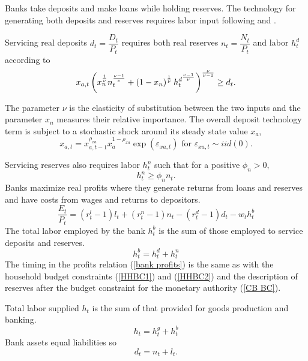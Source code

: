 \documentclass[]{article}
\begin{document}
Banks take deposits and make loans while holding reserves. The technology
for generating both deposits and reserves requires labor input following
\textcite{christiano1995inside} and \textcite{ireland2014macroeconomics}.

Servicing real deposits $d_{t}=\dfrac{D_{t}}{P_{t}}$ requires both real reserves $n_{t}=\dfrac{N_{t}}{P_{t}}$ and
labor $h_{t}^{d}$ according to
\begin{equation} \label{d}
x_{a,t}\left( x_{n}^{\frac{1}{\nu }}n_{t}^{\frac{\nu -1}{\nu }}+\left(
1-x_{n}\right) ^{\frac{1}{\nu }}h_{t}^{d^{\frac{\nu -1}{\nu }}}\right) ^{%
\frac{\nu }{\nu -1}}\geq d_{t}.
\end{equation}

The parameter $\nu $ is the elasticity of substitution between the two
inputs and the parameter $x_{n}$ measures their relative importance. The overall deposit technology term is subject to a stochastic shock around its steady state value $x_{a}$,
\begin{equation}
x_{a,t}=x_{a,t-1}^{\rho_{xa}}x_{a}^{1-\rho_{xa}}\exp(\varepsilon_{xa,t}) \text{ for }\varepsilon_{xa,t}\sim
iid\left( 0\right).
\label{xa}
\end{equation}%

Servicing reserves also requires labor $h_{t}^{n}$ such that for a positive $%
\phi _{n}>0,$%
\begin{equation} \label{hn}
h_{t}^{n}\geq \phi _{n}n_{t}.
\end{equation}
Banks maximize real profits where they generate returns from loans and reserves and have costs
from wages and returns to depositors.
\begin{equation} \label{bank profits}
\frac{E_{t}}{P_{t}}=\left( r_{t}^{l}-1\right) l_{t}+\left(
r_{t}^{n}-1\right) n_{t}-\left( r_{t}^{d}-1\right) d_{t}-w_{t}h_{t}^{b}
\end{equation}%
The total labor employed by the bank $h_{t}^{b}$ is the sum of those
employed to service deposits and reserves. 
\begin{equation} \label{hb}
h_{t}^{b}=h_{t}^{d}+h_{t}^{n}
\end{equation}
The timing in the profits relation (\ref{bank profits}) is the same as with the household budget constraints (\ref{HHBC1}) and (\ref{HHBC2}) and the description of reserves after the budget constraint for the monetary authority (\ref{CB BC}).

Total labor supplied $h_{t}$ is the sum of that provided for goods production and banking.
\begin{equation} \label{h}
h_{t}=h_{t}^{g}+h_{t}^{b}
\end{equation}
Bank assets equal liabilities so
\begin{equation} \label{dnl}
d_{t}=n_{t}+l_{t}.
\end{equation}
\end{document}
